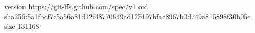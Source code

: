 version https://git-lfs.github.com/spec/v1
oid sha256:5a1fbcf7c5a56a81d12f48770649ad125197bfac8967b0d749a815898f30b05e
size 131168
